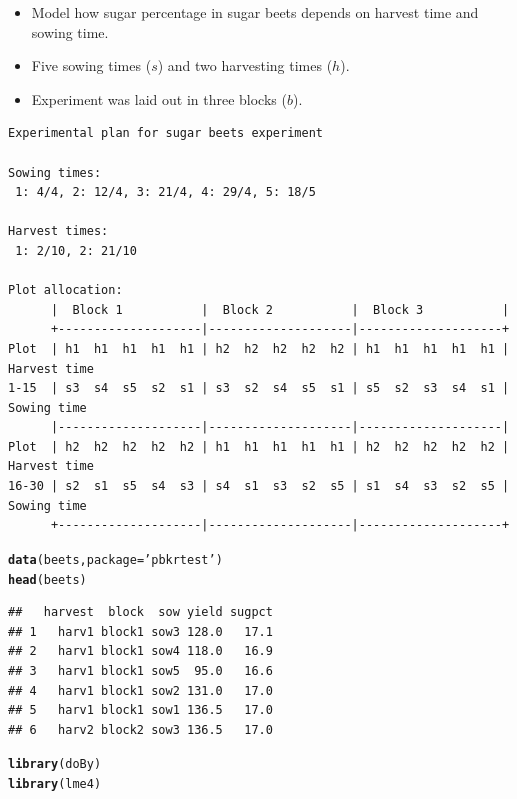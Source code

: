\documentclass[compress]{beamer}\usepackage[]{graphicx}\usepackage[]{color}
\makeatletter
\newcommand{\hlstr}[1]{\textcolor[rgb]{0.192,0.494,0.8}{#1}}%
\newcommand{\hlstd}[1]{\textcolor[rgb]{0.345,0.345,0.345}{#1}}%
\newcommand{\hlkwc}[1]{\textcolor[rgb]{0.333,0.667,0.333}{#1}}%
\newcommand{\hlkwd}[1]{\textcolor[rgb]{0.737,0.353,0.396}{\textbf{#1}}}%
\newenvironment{kframe}{%
 \def\at@end@of@kframe{}%
 \ifinner\ifhmode%
  \def\at@end@of@kframe{\end{minipage}}%
  \begin{minipage}{\columnwidth}%
 \fi\fi%
 \def\FrameCommand##1{\hskip\@totalleftmargin \hskip-\fboxsep
 \colorbox{shadecolor}{##1}\hskip-\fboxsep
     \hskip-\linewidth \hskip-\@totalleftmargin \hskip\columnwidth}%
 \MakeFramed {\advance\hsize-\width
   \@totalleftmargin\z@ \linewidth\hsize
   \@setminipage}}%
 {\par\unskip\endMakeFramed%
 \at@end@of@kframe}
\newenvironment{knitrout}{}{} %
\newenvironment{sframe}
{\begin{frame} [containsverbatim] }
  {\end{frame}}
\makeatother
\begin{document}
\begin{sframe}
 \begin{itemize}
 \item Model how sugar percentage in sugar beets depends on
   harvest time and sowing time.
 \item Five sowing times ($s$) and two harvesting times ($h$).
 \item Experiment was laid out in three blocks ($b$).
 \end{itemize}

{\tiny
\begin{verbatim}
Experimental plan for sugar beets experiment

Sowing times:
 1: 4/4, 2: 12/4, 3: 21/4, 4: 29/4, 5: 18/5

Harvest times:
 1: 2/10, 2: 21/10

Plot allocation:
      |  Block 1           |  Block 2           |  Block 3           |
      +--------------------|--------------------|--------------------+
Plot  | h1  h1  h1  h1  h1 | h2  h2  h2  h2  h2 | h1  h1  h1  h1  h1 | Harvest time
1-15  | s3  s4  s5  s2  s1 | s3  s2  s4  s5  s1 | s5  s2  s3  s4  s1 | Sowing time
      |--------------------|--------------------|--------------------|
Plot  | h2  h2  h2  h2  h2 | h1  h1  h1  h1  h1 | h2  h2  h2  h2  h2 | Harvest time
16-30 | s2  s1  s5  s4  s3 | s4  s1  s3  s2  s5 | s1  s4  s3  s2  s5 | Sowing time
      +--------------------|--------------------|--------------------+
\end{verbatim}
}
\end{sframe}

\begin{sframe}
\begin{knitrout}\scriptsize
{}\color{fgcolor}\begin{kframe}
\begin{alltt}
\hlkwd{data}\hlstd{(beets,} \hlkwc{package}\hlstd{=}\hlstr{'pbkrtest'}\hlstd{)}
\hlkwd{head}\hlstd{(beets)}
\end{alltt}
\begin{verbatim}
##   harvest  block  sow yield sugpct
## 1   harv1 block1 sow3 128.0   17.1
## 2   harv1 block1 sow4 118.0   16.9
## 3   harv1 block1 sow5  95.0   16.6
## 4   harv1 block1 sow2 131.0   17.0
## 5   harv1 block1 sow1 136.5   17.0
## 6   harv2 block2 sow3 136.5   17.0
\end{verbatim}
\begin{alltt}
\hlkwd{library}\hlstd{(doBy)}
\hlkwd{library}\hlstd{(lme4)}
\end{alltt}
\end{kframe}
\end{knitrout}
\end{sframe}
\end{document}
